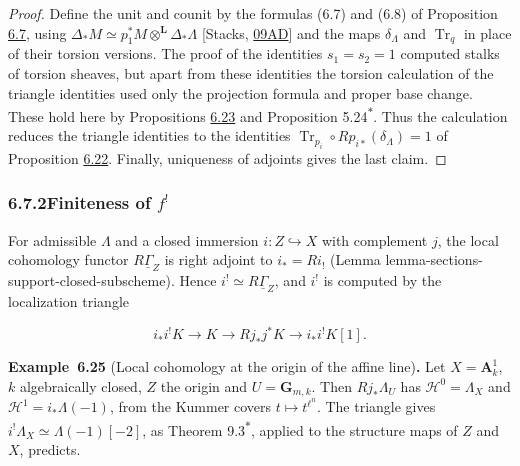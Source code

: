 \documentclass[11pt]{article}
\newenvironment{bpstatement}[2]{\par\addvspace{0.6\baselineskip}\noindent\textbf{#1}#2\textbf{.}\enspace\ignorespaces}
  {\par\addvspace{0.4\baselineskip}}
\newcommand{\bpout}[1]{#1\textsuperscript{\hyperlink{bp-outside}{\ensuremath{\ast}}}}
\begin{document}
\begin{proof}[{Proof}]\label{bp76}%
Define the unit and counit by the formulas (6.7) and (6.8) of Proposition \hyperref[bp22]{6.7}, using \(\Delta_*M\simeq p_1^*M\otimes^{\mathbf L}\Delta_*\Lambda\) [Stacks, \href{https://stacks.math.columbia.edu/tag/09AD}{09AD}] and the maps \(\delta_\Lambda\) and \(\operatorname{Tr}_q\) in place of their torsion versions. The proof of the identities \(s_1=s_2=1\) computed stalks of torsion sheaves, but apart from these identities the torsion calculation of the triangle identities used only the projection formula and proper base change. These hold here by Propositions \hyperref[bp72]{6.23} and \bpout{Proposition 5.24}. Thus the calculation reduces the triangle identities to the identities \(\operatorname{Tr}_{p_i}\circ Rp_{i*}(\delta_\Lambda)=1\) of Proposition \hyperref[bp69]{6.22}. Finally, uniqueness of adjoints gives the last claim.
\end{proof}


\subsubsection*{\texorpdfstring{6.7.2\quad Finiteness of $f^!$}{6.7.2 Finiteness of f!}}
\label{bp77}%
\label{bp78}%
For admissible \(\Lambda\) and a closed immersion \(i:Z\hookrightarrow X\) with complement \(j\), the local cohomology functor \(R\underline\Gamma_Z\) is right adjoint to \(i_*=Ri_!\) (Lemma lemma-sections-support-closed-subscheme). Hence \(i^!\simeq R\underline\Gamma_Z\), and \(i^!\) is computed by the localization triangle

\[
i_*i^!K\longrightarrow K\longrightarrow Rj_*j^*K
\longrightarrow i_*i^!K[1].
\]

\label{bp79}%
\begin{bpstatement}{Example~6.25}{ (Local cohomology at the origin of the affine line)}
Let \(X=\mathbf A^1_k\), \(k\) algebraically closed, \(Z\) the origin and \(U=\mathbf G_{m,k}\). Then \(Rj_*\Lambda_U\) has \(\mathcal H^0=\Lambda_X\) and \(\mathcal H^1=i_*\Lambda(-1)\), from the Kummer covers \(t\mapsto t^{\ell^n}\). The triangle gives \(i^!\Lambda_X\simeq\Lambda(-1)[-2]\), as Theorem \bpout{9.3}, applied to the structure maps of \(Z\) and \(X\), predicts.
\end{bpstatement}
\end{document}
